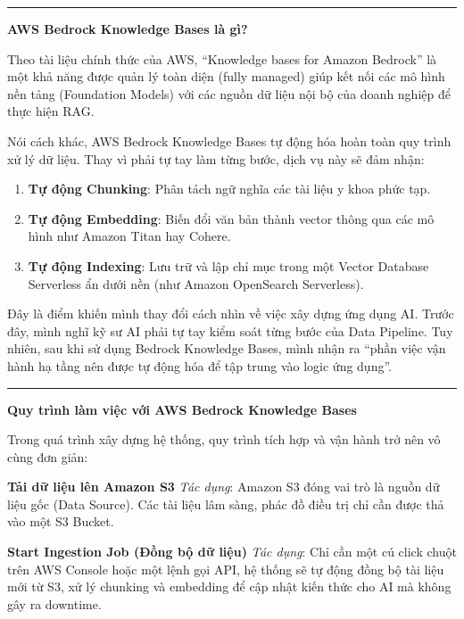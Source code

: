 \begin{center}\rule{0.5\linewidth}{0.5pt}\end{center}

\vspace{0.5em}\noindent\textbf{AWS Bedrock Knowledge Bases là gì?}

Theo tài liệu chính thức của AWS, ``Knowledge bases for Amazon Bedrock''
là một khả năng được quản lý toàn diện (fully managed) giúp kết nối các
mô hình nền tảng (Foundation Models) với các nguồn dữ liệu nội bộ của
doanh nghiệp để thực hiện RAG.

Nói cách khác, AWS Bedrock Knowledge Bases tự động hóa hoàn toàn quy
trình xử lý dữ liệu. Thay vì phải tự tay làm từng bước, dịch vụ này sẽ
đảm nhận:

\begin{enumerate}
\def\labelenumi{\arabic{enumi}.}
\tightlist
\item
  \textbf{Tự động Chunking}: Phân tách ngữ nghĩa các tài liệu y khoa
  phức tạp.
\item
  \textbf{Tự động Embedding}: Biến đổi văn bản thành vector thông qua
  các mô hình như Amazon Titan hay Cohere.
\item
  \textbf{Tự động Indexing}: Lưu trữ và lập chỉ mục trong một Vector
  Database Serverless ẩn dưới nền (như Amazon OpenSearch Serverless).
\end{enumerate}

Đây là điểm khiến mình thay đổi cách nhìn về việc xây dựng ứng dụng AI.
Trước đây, mình nghĩ kỹ sư AI phải tự tay kiểm soát từng bước của Data
Pipeline. Tuy nhiên, sau khi sử dụng Bedrock Knowledge Bases, mình nhận
ra ``phần việc vận hành hạ tầng nên được tự động hóa để tập trung vào
logic ứng dụng''.

\begin{center}\rule{0.5\linewidth}{0.5pt}\end{center}

\vspace{0.5em}\noindent\textbf{Quy trình làm việc với AWS Bedrock Knowledge Bases}

Trong quá trình xây dựng hệ thống, quy trình tích hợp và vận hành trở
nên vô cùng đơn giản:

\textbf{Tải dữ liệu lên Amazon S3} \emph{Tác dụng}: Amazon S3 đóng vai
trò là nguồn dữ liệu gốc (Data Source). Các tài liệu lâm sàng, phác đồ
điều trị chỉ cần được thả vào một S3 Bucket.

\textbf{Start Ingestion Job (Đồng bộ dữ liệu)} \emph{Tác dụng}: Chỉ cần
một cú click chuột trên AWS Console hoặc một lệnh gọi API, hệ thống sẽ
tự động đồng bộ tài liệu mới từ S3, xử lý chunking và embedding để cập
nhật kiến thức cho AI mà không gây ra downtime.


